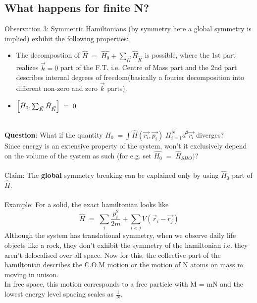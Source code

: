 \documentclass[12pt]{article}
\begin{document}
\subsection{What happens for finite N?}
Observation 3: Symmetric Hamiltonians (by symmetry here a global symmetry is implied) exhibit the following properties:

\begin{itemize}
    \item The decompostion of $\hat{H}\;=\;\hat{H_0} + \sum_{\Vec{K}}\hat{H}_{\Vec{K}}$ is possible, where the 1st part realizes $\Vec{k}=0$ part of the F.T. i.e. Centre of Mass part and the 2nd part describes internal degrees of freedom(basically a fourier decomposition into different non-zero and zero $\Vec{k}$ parts).
    \item $\comm{\hat{H}_0}{\sum_{\Vec{K}}\hat{H}_{\Vec{K}}}\;=\;0$
\end{itemize}\\
\textbf{Question}: What if the quantity $H_0\;=\int \hat{H}(\Vec{r_i},\Vec{p_i})\; \Pi_{i=1}^N d^3\Vec{r_i}$ diverges?\\ Since energy is an extensive property of the system, won't it exclusively depend on the volume of the system as such (for e.g. set $\hat{H_0}\;=\;\hat{H}_{SHO})$?\\
\\
Claim: The \textbf{global} symmetry breaking can be explained only by using $\hat{H}_0$ part of $\hat{H}$.\\
\\
Example: For a solid, the exact hamiltonian looks like
$$\hat{H}\;=\;\sum_i \frac{p_i^2}{2m}+\sum_{i<j}V(\Vec{r}_i-\Vec{r_j})$$
Although the system has translational symmetry, when we observe daily life objects like a rock, they don't exhibit the symmetry of the hamiltonian i.e. they aren't delocalised over all space. Now for this, the collective part of the hamiltonian describes the C.O.M motion or the motion of N atoms on mass m moving in unison.\\
In free space, this motion corresponds to a free particle with M = mN and the lowest energy level spacing scales as $\frac{1}{N}$.\\
\end{document}

